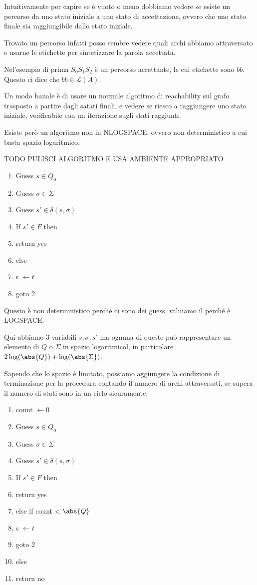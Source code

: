 
Intuitivamente per capire se è vuoto o meno dobbiamo vedere se esiste un percorso da uno stato iniziale a uno stato di accettazione, ovvero che uno stato finale sia raggiungibile dallo stato iniziale.

Trovato un percorso infatti posso sembre vedere quali archi abbiamo attraversato e usarne le etichette per sintetizzare la parola accettata.

Nel'esempio di prima \(S_0 S_1 S_2\) è un percorso accettante, le cui etichette sono \(bb\). Questo ci dice che \(bb\in \mathcal{L}(A)\).

Un modo banale è di usare un normale algoritmo di reachability sul grafo trasposto a partire dagli satati finali, e vedere se riesco a raggiungere uno stato iniziale, verificabile con un iterazione sugli stati raggiunti.

Esiste però un algoritmo non in NLOGSPACE, ovvero non deterministico a cui basta spazio logaritmico.

TODO PULISCI ALGORITMO E USA AMBIENTE APPROPRIATO

\begin{enumerate}
  \item Guess \(s \in Q_0\)
  \item Guess \(\sigma \in \Sigma\)
  \item Guess \(s' \in \delta(s,\sigma)\)
  \item If \(s' \in F\) then
  \item return yes
  \item else
  \item s \(\gets t\)
  \item goto 2
\end{enumerate}

Questo è non deterministico perché ci sono dei guess, valuiamo il perché è LOGSPACE\@.

Qui abbiamo 3 variabili \(s, \sigma, s'\) ma ognuna di queste può rappresentare un elemento di \(Q\) o \(\Sigma\) in spazio logaritmicol, in particolare \(2\log(\abs{Q}) + \log(\abs{\Sigma})\).

Sapendo che lo spazio è limitato, possiamo aggiungere la condizione di terminazione per la procedura contando il numero di archi attraversati, se supera il numero di stati sono in un ciclo sicuramente.

\begin{enumerate}
  \item count \(\gets 0\)
  \item Guess \(s \in Q_0\)
  \item Guess \(\sigma \in \Sigma\)
  \item Guess \(s' \in \delta(s,\sigma)\)
  \item If \(s' \in F\) then
  \item   return yes
  \item else if count < \(\abs{Q}\)
  \item   s \(\gets t\)
  \item goto 2
  \item else
  \item   return no
\end{enumerate}

